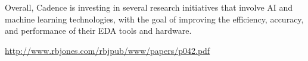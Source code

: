 \documentclass[10pt,titlepage]{book}
\begin{document}
Overall, Cadence is investing in several research initiatives that involve AI and machine learning technologies, with the goal of improving the efficiency, accuracy, and performance of their EDA tools and hardware.


{}





\tiny{


\href{http://www.rbjones.com/rbjpub/www/papers/p032.pdf}{http://www.rbjones.com/rbjpub/www/papers/p042.pdf}

}%
\end{document}
